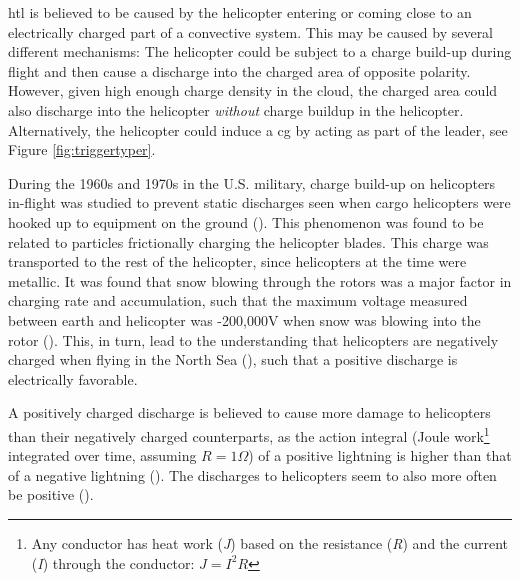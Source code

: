 \acrshort{htl} is believed to be caused by the helicopter entering or coming close to an electrically charged part of a convective system. This may be caused by several different mechanisms: The helicopter could be subject to a charge build-up during flight and then cause a discharge into the charged area of opposite polarity. However, given high enough charge density in the cloud, the charged area could also discharge into the helicopter \textit{without} charge buildup in the helicopter. Alternatively, the helicopter could induce a \acrshort{cg} by acting as part of the leader, see Figure \ref{fig:triggertyper}. 

During the 1960s and 1970s in the U.S. military, charge build-up on helicopters in-flight was studied to prevent static discharges seen when cargo helicopters were hooked up to equipment on the ground (\cite{ad750617}). This phenomenon was found to be related to particles frictionally charging the helicopter blades. This charge was transported to the rest of the helicopter, since helicopters at the time were metallic. It was found that snow blowing through the rotors was a major factor in charging rate and accumulation, such that the maximum voltage measured between earth and helicopter was -200,000V when snow was blowing into the rotor (\cite{ad282087}). This, in turn, lead to the understanding that helicopters are negatively charged when flying in the North Sea (\cite{wilkinson2013}), such that a positive discharge is electrically favorable.

A positively charged discharge is believed to cause more damage to helicopters than their negatively charged counterparts, as the action integral (Joule work\footnote{Any conductor has heat work (\textit{J}) based on the resistance (\textit{R}) and the current (\textit{I}) through the conductor: $J = I^2 R$} integrated over time, assuming $R = 1 \Omega$) of a positive lightning is higher than that of a negative lightning (\cite{hardwick1999}). The discharges to helicopters seem to also more often be positive (\cite{hardwick1999}).

